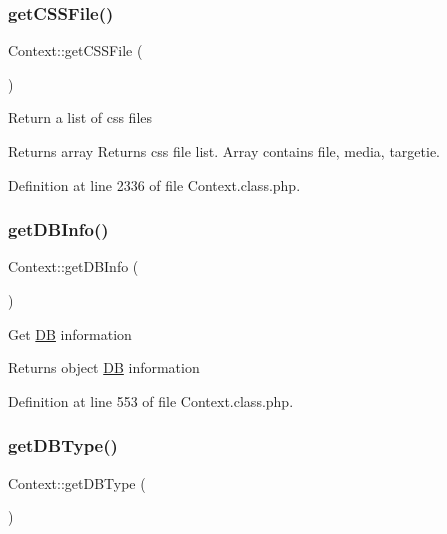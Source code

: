 \subsubsection{\texorpdfstring{get\+C\+S\+S\+File()}{getCSSFile()}}
{\footnotesize\ttfamily Context\+::get\+C\+S\+S\+File (\begin{DoxyParamCaption}{ }\end{DoxyParamCaption})}

Return a list of css files

\begin{DoxyReturn}{Returns}
array Returns css file list. Array contains file, media, targetie. 
\end{DoxyReturn}


Definition at line 2336 of file Context.\+class.\+php.

\hypertarget{classContext_a54dd61c7b035a12697db8ca3f1c6849c}{}\label{classContext_a54dd61c7b035a12697db8ca3f1c6849c} 
\subsubsection{\texorpdfstring{get\+D\+B\+Info()}{getDBInfo()}}
{\footnotesize\ttfamily Context\+::get\+D\+B\+Info (\begin{DoxyParamCaption}{ }\end{DoxyParamCaption})}

Get \hyperlink{classDB}{DB} information

\begin{DoxyReturn}{Returns}
object \hyperlink{classDB}{DB} information 
\end{DoxyReturn}


Definition at line 553 of file Context.\+class.\+php.

\hypertarget{classContext_a2e90e7083bcc220daeec3d4d8d3bb427}{}\label{classContext_a2e90e7083bcc220daeec3d4d8d3bb427} 
\subsubsection{\texorpdfstring{get\+D\+B\+Type()}{getDBType()}}
{\footnotesize\ttfamily Context\+::get\+D\+B\+Type (\begin{DoxyParamCaption}{ }\end{DoxyParamCaption})}


